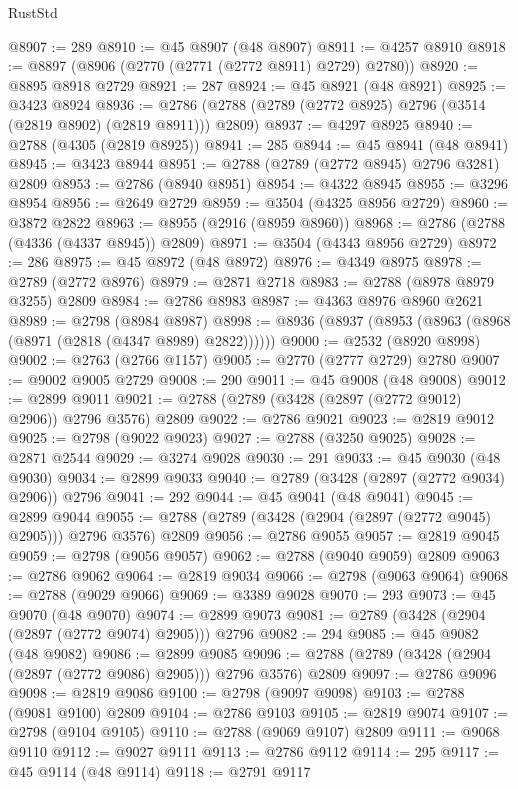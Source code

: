 \begin{lexlean}{RustStd}
\begin{coremodule}
@8907 := 289
@8910 := @45 @8907 (@48 @8907)
@8911 := @4257 @8910
@8918 := @8897 (@8906 (@2770 (@2771 (@2772 @8911) @2729) @2780))
@8920 := @8895 @8918 @2729
@8921 := 287
@8924 := @45 @8921 (@48 @8921)
@8925 := @3423 @8924
@8936 := @2786 (@2788 (@2789 (@2772 @8925) @2796 (@3514 (@2819 @8902) (@2819 @8911))) @2809)
@8937 := @4297 @8925
@8940 := @2788 (@4305 (@2819 @8925))
@8941 := 285
@8944 := @45 @8941 (@48 @8941)
@8945 := @3423 @8944
@8951 := @2788 (@2789 (@2772 @8945) @2796 @3281) @2809
@8953 := @2786 (@8940 @8951)
@8954 := @4322 @8945
@8955 := @3296 @8954
@8956 := @2649 @2729
@8959 := @3504 (@4325 @8956 @2729)
@8960 := @3872 @2822
@8963 := @8955 (@2916 (@8959 @8960))
@8968 := @2786 (@2788 (@4336 (@4337 @8945)) @2809)
@8971 := @3504 (@4343 @8956 @2729)
@8972 := 286
@8975 := @45 @8972 (@48 @8972)
@8976 := @4349 @8975
@8978 := @2789 (@2772 @8976)
@8979 := @2871 @2718
@8983 := @2788 (@8978 @8979 @3255) @2809
@8984 := @2786 @8983
@8987 := @4363 @8976 @8960 @2621
@8989 := @2798 (@8984 @8987)
@8998 := @8936 (@8937 (@8953 (@8963 (@8968 (@8971 (@2818 (@4347 @8989) @2822))))))
@9000 := @2532 (@8920 @8998)
@9002 := @2763 (@2766 @1157)
@9005 := @2770 (@2777 @2729) @2780
@9007 := @9002 @9005 @2729
@9008 := 290
@9011 := @45 @9008 (@48 @9008)
@9012 := @2899 @9011
@9021 := @2788 (@2789 (@3428 (@2897 (@2772 @9012) @2906)) @2796 @3576) @2809
@9022 := @2786 @9021
@9023 := @2819 @9012
@9025 := @2798 (@9022 @9023)
@9027 := @2788 (@3250 @9025)
@9028 := @2871 @2544
@9029 := @3274 @9028
@9030 := 291
@9033 := @45 @9030 (@48 @9030)
@9034 := @2899 @9033
@9040 := @2789 (@3428 (@2897 (@2772 @9034) @2906)) @2796
@9041 := 292
@9044 := @45 @9041 (@48 @9041)
@9045 := @2899 @9044
@9055 := @2788 (@2789 (@3428 (@2904 (@2897 (@2772 @9045) @2905))) @2796 @3576) @2809
@9056 := @2786 @9055
@9057 := @2819 @9045
@9059 := @2798 (@9056 @9057)
@9062 := @2788 (@9040 @9059) @2809
@9063 := @2786 @9062
@9064 := @2819 @9034
@9066 := @2798 (@9063 @9064)
@9068 := @2788 (@9029 @9066)
@9069 := @3389 @9028
@9070 := 293
@9073 := @45 @9070 (@48 @9070)
@9074 := @2899 @9073
@9081 := @2789 (@3428 (@2904 (@2897 (@2772 @9074) @2905))) @2796
@9082 := 294
@9085 := @45 @9082 (@48 @9082)
@9086 := @2899 @9085
@9096 := @2788 (@2789 (@3428 (@2904 (@2897 (@2772 @9086) @2905))) @2796 @3576) @2809
@9097 := @2786 @9096
@9098 := @2819 @9086
@9100 := @2798 (@9097 @9098)
@9103 := @2788 (@9081 @9100) @2809
@9104 := @2786 @9103
@9105 := @2819 @9074
@9107 := @2798 (@9104 @9105)
@9110 := @2788 (@9069 @9107) @2809
@9111 := @9068 @9110
@9112 := @9027 @9111
@9113 := @2786 @9112
@9114 := 295
@9117 := @45 @9114 (@48 @9114)
@9118 := @2791 @9117

\end{coremodule}
\end{lexlean}
